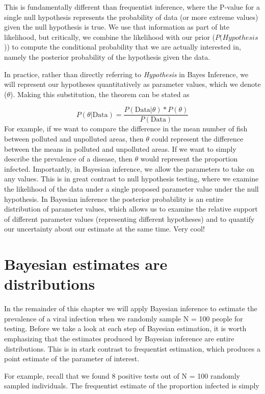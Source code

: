 \documentclass[
]{book}
\begin{document}
This is fundamentally different than frequentist inference, where the
P-value for a single null hypothesis represents the probability of data
(or more extreme values) given the null hypothesis is true. We use that information as part of hte likelihood, but critically, we combine the likelihood with our prior
(\(P(Hypothesis\))) to compute the conditional probability that we are
actually interested in, namely the posterior probability of the
hypothesis given the data.

In practice, rather than directly referring to \emph{Hypothesis} in Bayes Inference, we will represent our hypotheses quantitatively as parameter values, which we denote (\(\theta\)). Making this substitution, the theorem can be stated as

\[
P(\theta|\text{Data}) = \frac{P(\text{Data}|\theta)*P(\theta)}{P(\text{Data})}
\]
For example, if we want to compare the difference in the mean number of fish
between polluted and unpolluted areas, then \(\theta\) could represent the
difference between the means in polluted and unpolluted areas. If we
want to simply describe the prevalence of a disease, then \(\theta\) would represent the proportion infected. Importantly, in Bayesian inference, we allow the parameters to take on any values. This is in great contrast to null hypothesis testing, where we examine the likelihood of the data under a single proposed parameter value under the null hypothesis. In Bayesian inference the posterior probability is an entire distribution of parameter values, which allows us to examine the relative support of different parameter values (representing different hypotheses) and to quantify our uncertainty about our estimate at the same time. Very cool!

\section{Bayesian estimates are distributions}\label{bayesian-estimates-are-distributions}

In the remainder of this chapter we will apply Bayesian inference to estimate the prevalence of a viral infection when we randomly sample N = 100 people for testing. Before we take a look at each step of Bayesian estimation, it is worth emphasizing that the estimates produced by Bayesian inference are entire distributions. This is in stark contrast to frequentist estimation, which produces a point estimate of the parameter of interest.

For example, recall that we found 8 positive tests out of N = 100 randomly sampled individuals. The frequentist estimate of the proportion infected is simply
\end{document}
